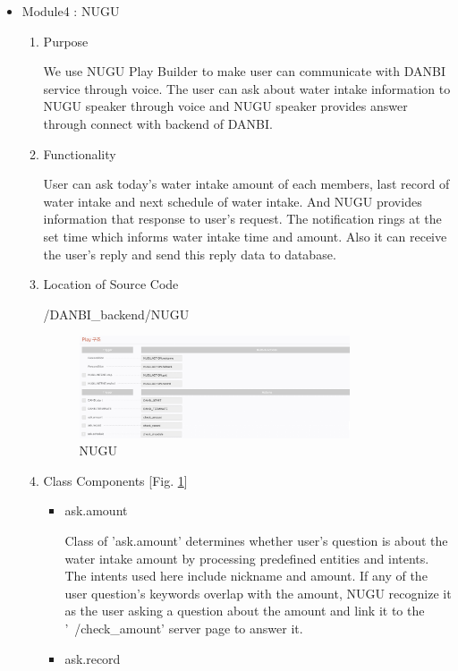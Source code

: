 \documentclass[conference]{IEEEtran}
\begin{document}
\begin{itemize}
    \item Module4 : NUGU
    \begin{enumerate}
    \setlength{\parindent}{2ex}
    \setlength{\parskip}{0.5em}
        \item Purpose
        
        We use NUGU Play Builder to make user can communicate with  DANBI service through voice. The user can ask about water intake information to NUGU speaker through voice and NUGU speaker provides answer through connect with backend of DANBI.
        \item Functionality
        
        User can ask today's water intake amount of each members, last record of water intake and next schedule of water intake. And NUGU provides information that response to user's request. The notification rings at the set time which informs water intake time and amount. Also it can receive the user's reply and send this reply data to database.
        \item Location of Source Code
        
        /DANBI\_backend/NUGU
        \par \begin{figure}[h!]
        \includegraphics[width=8cm]{image/NUGU.jpg}
        \centering
        \caption{NUGU}
        \label{fig:NUGU}
        \end{figure}
        \item Class Components [Fig. \ref{fig:NUGU}]
        \begin{itemize}
            \item ask.amount 
            \setlength{\parindent}{2ex}
            
            Class of 'ask.amount' determines whether user's question is about the water intake amount by processing predefined entities and intents. The intents used here include {{nickname}} and {{amount}}. If any of the user question's keywords overlap with the {{amount}}, NUGU recognize it as the user asking a question about the amount and link it to the '~/check\_amount' server page to answer it.
            \item ask.record 
            \setlength{\parindent}{2ex}
            

\end{itemize}
\end{enumerate}
\end{itemize}
\end{document}
